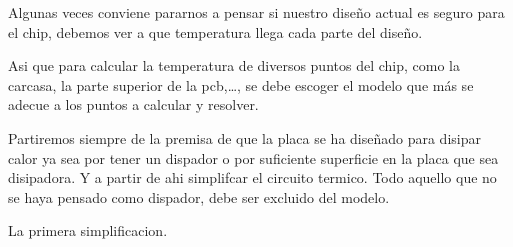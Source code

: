 Algunas veces conviene pararnos a pensar si nuestro diseño actual es seguro
para el chip, debemos ver a que temperatura llega cada parte del diseño. 

Asi que para calcular la temperatura de diversos puntos del chip, como la carcasa, la
parte superior de la pcb,\dots, se debe escoger el modelo que más se adecue a
los puntos a calcular y resolver.

Partiremos siempre de la premisa de que la placa se ha diseñado para disipar
calor ya sea por tener un dispador o por suficiente superficie en la placa
que sea disipadora. Y a partir de ahi simplifcar el circuito termico. Todo
aquello que no se haya pensado como dispador, debe ser excluido del modelo.

La primera simplificacion.
